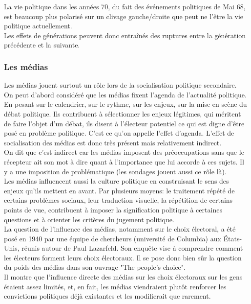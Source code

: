\documentclass[12pt, a4paper, openany]{book}
\begin{document}
La vie politique dans les années 70, du fait des événements politiques de Mai 68, est beaucoup plus polarisé sur un clivage gauche/droite que peut ne l'être la vie politique actuellement. \\
Les effets de générations peuvent donc entraînés des ruptures entre la génération précédente et la suivante. 

\subsubsection{Les médias}

Les médias jouent surtout un rôle lors de la socialisation politique secondaire. \\
On peut d'abord considéré que les médias fixent l'agenda de l'actualité politique. En pesant sur le calendrier, sur le rythme, sur les enjeux, sur la mise en scène du débat politique. Ils contribuent à sélectionner les enjeux légitimes, qui méritent de faire l'objet d'un débat, ils disent à l'électeur potentiel ce qui est digne d'être posé en problème politique. C'est ce qu'on appelle l'effet d'agenda. L'effet de socialisation des médias est donc très présent mais relativement indirect. \\
On dit que c'est indirect car les médias imposent des préoccupations sans que le récepteur ait son mot à dire quant à l'importance que lui accorde à ces sujets. Il y a une imposition de problématique (les sondages jouent aussi ce rôle là). \\
Les médias influencent aussi la culture politique en construisant le sens des enjeux qu'ils mettent en avant. Par plusieurs moyens: le traitement répété de certains problèmes sociaux, leur traduction visuelle, la répétition de certains points de vue, contribuent à imposer la signification politique à certaines questions et à orienter les critères du jugement politique. \\
La question de l'influence des médias, notamment sur le choix électoral, a été posé en 1940 par une équipe de chercheurs (université de Columbia) aux États-Unis, réunis autour de Paul Lazarfeld. Son enquête vise à comprendre comment les électeurs forment leurs choix électoraux. Il se pose donc bien sûr la question du poids des médias dans son ouvrage "The people's choice". \\
Il montre que l'influence directe des médias sur les choix électoraux sur les gens étaient assez limités, et, en fait, les médias viendraient plutôt renforcer les convictions politiques déjà existantes et les modifierait que rarement. \\
\end{document}
